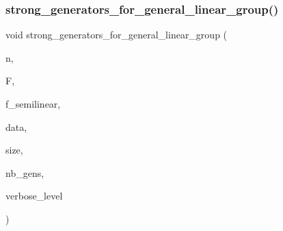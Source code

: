 \subsubsection{\texorpdfstring{strong\+\_\+generators\+\_\+for\+\_\+general\+\_\+linear\+\_\+group()}{strong\_generators\_for\_general\_linear\_group()}}
{\footnotesize\ttfamily void strong\+\_\+generators\+\_\+for\+\_\+general\+\_\+linear\+\_\+group (\begin{DoxyParamCaption}\item[{\mbox{\hyperlink{galois_8h_a09fddde158a3a20bd2dcadb609de11dc}{I\+NT}}}]{n,  }\item[{\mbox{\hyperlink{classfinite__field}{finite\+\_\+field}} $\ast$}]{F,  }\item[{\mbox{\hyperlink{galois_8h_a09fddde158a3a20bd2dcadb609de11dc}{I\+NT}}}]{f\+\_\+semilinear,  }\item[{\mbox{\hyperlink{galois_8h_a09fddde158a3a20bd2dcadb609de11dc}{I\+NT}} $\ast$\&}]{data,  }\item[{\mbox{\hyperlink{galois_8h_a09fddde158a3a20bd2dcadb609de11dc}{I\+NT}} \&}]{size,  }\item[{\mbox{\hyperlink{galois_8h_a09fddde158a3a20bd2dcadb609de11dc}{I\+NT}} \&}]{nb\+\_\+gens,  }\item[{\mbox{\hyperlink{galois_8h_a09fddde158a3a20bd2dcadb609de11dc}{I\+NT}}}]{verbose\+\_\+level }\end{DoxyParamCaption})}

\mbox{\label{group__generators_8_c_a4fe49c697ebf84e82d48ee21def3e91d}} 

